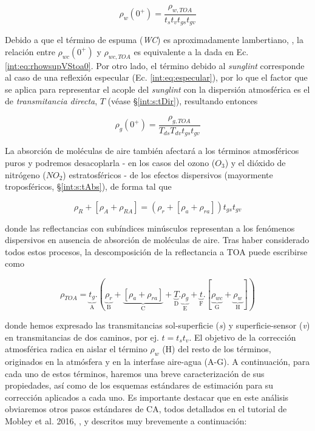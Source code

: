     \begin{equation}
        \rho_{w}(0^{+}) = \frac{\rho_{w,TOA}}{t_{s}t_{v}t_{gs}t_{gv}}
        \label{int:eq:rhowsupVStoa}
    \end{equation}

    Debido a que el término de espuma (\textit{WC}) es aproximadamente lambertiano, \cite{gordon1994b}, la relación entre $\rho_{wc}(0^{+})$ y $\rho_{wc,TOA}$ es equivalente a la dada en Ec. \ref{int:eq:rhowsupVStoa0}. Por otro lado, el término debido al \textit{sunglint} corresponde al caso de una reflexión especular (Ec. \ref{int:eq:especular}), por lo que el factor que se aplica para representar el acople del \textit{sunglint} con la dispersión atmosférica es el de \textit{transmitancia directa}, $T$ (véase \S \ref{int:s:tDir}), resultando entonces

    \begin{equation}
        \rho_{g}(0^{+}) = \frac{\rho_{g,TOA}}{T_{ds}T_{dv}t_{gs}t_{gv}}
        \label{int:eq:rhogsupVStoa}
    \end{equation}
    
    La absorción de moléculas de aire también afectará a los términos atmosféricos puros y podremos desacoplarla - en los casos del ozono ($O_{3}$) y el dióxido de nitrógeno ($NO_{2}$) estratosféricos - de los efectos dispersivos (mayormente troposféricos, \S \ref{int:s:tAbs}), de forma tal que

    \begin{equation}
        \rho_{R} + [\rho_{A} + \rho_{RA}] = (\rho_{r} + [\rho_{a} + \rho_{ra}])t_{gs}t_{gv}
        \label{int:eq:rhorAbs}
    \end{equation}

    \noindent donde las reflectancias con subíndices minúsculos representan a los fenómenos dispersivos en ausencia de absorción de moléculas de aire. Tras haber considerado todos estos procesos, la descomposición de la reflectancia a TOA puede escribirse como

    \begin{equation}
        \rho_{TOA} = \underbrace{t_{g}}_\text{A}.(\underbrace{\rho_{r}}_\text{B} + \underbrace{[\rho_{a} + \rho_{ra}]}_\text{C} + \underbrace{T}_\text{D}.\underbrace{\rho_{g}}_\text{E} + \underbrace{t}_\text{F}.[\underbrace{\rho_{wc}}_\text{G} + \underbrace{\rho_{w}}_\text{H}])
        \label{int:eq:rhotoa}
    \end{equation}

    \noindent donde hemos expresado las transmitancias sol-superficie (\textit{s}) y superficie-sensor (\textit{v}) en transmitancias de dos caminos, por ej. $t = t_{s}t_{v}$. El objetivo de la corrección atmosférica radica en aislar el término $\rho_{w}$ (H) del resto de los términos, originados en la atmósfera y en la interfase aire-agua (A-G). A continuación, para cada uno de estos términos, haremos una breve caracterización de sus propiedades, así como de los esquemas estándares de estimación para su corrección aplicados a cada uno. Es importante destacar que en este análisis obviaremos otros pasos estándares de CA, todos detallados en el tutorial de Mobley et al. 2016, \cite{mobley2016}, y descritos muy brevemente a continuación:
    
